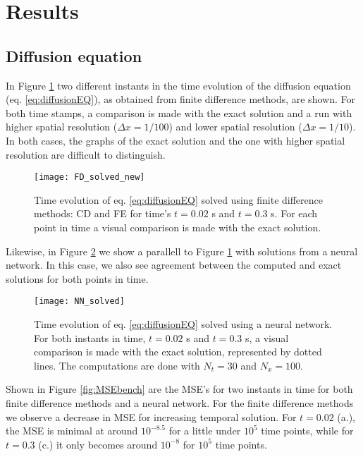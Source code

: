 \section{Results}
\label{sec:results}

\subsection{Diffusion equation}

In Figure \ref{fig:FDcompare} two different instants in the time evolution of the diffusion equation (eq. \ref{eq:diffusionEQ}), as obtained from finite difference methods, are shown. For both time stamps, a comparison is made with the exact solution and a run with higher spatial resolution ($\Delta x = 1/100$) and lower spatial resolution ($\Delta x = 1/10$). In both cases, the graphs of the exact solution and the one with higher spatial resolution are difficult to distinguish.
 \begin{figure}[htbp]
  	\centering
  	\texttt{[image: FD\_solved\_new]}
  	\caption{Time evolution of eq. \ref{eq:diffusionEQ} solved using finite difference methods: CD and FE for time's $t=0.02$ s and $t=0.3$ s. For each point in time a visual comparison is made with the exact solution.}
   \label{fig:FDcompare}
 \end{figure}

Likewise, in Figure \ref{fig:NNcompare} we show a parallell to Figure \ref{fig:FDcompare} with solutions from a neural network. In this case, we also see agreement between the computed and exact solutions for both points in time.
 \begin{figure}[htbp]
  	\centering
  	\texttt{[image: NN\_solved]}
  	\caption{Time evolution of eq. \ref{eq:diffusionEQ} solved using a neural network. For both instants in time, $t=0.02$ s and $t=0.3$ s, a visual comparison is made with the exact solution, represented by dotted lines. The computations are done with $N_t = 30$ and $N_x = 100$.}
   \label{fig:NNcompare}
 \end{figure}

Shown in Figure \ref{fig:MSEbench} are the MSE's for two instants in time for both finite difference methods and a neural network. For the finite difference methods we observe a decrease in MSE for increasing temporal solution. For $t=0.02$ (a.), the MSE is minimal at around $10^{-8.5}$ for a little under $10^5$ time points, while for $t=0.3$ (c.) it only becomes around $10^{-8}$ for $10^5$ time points.

